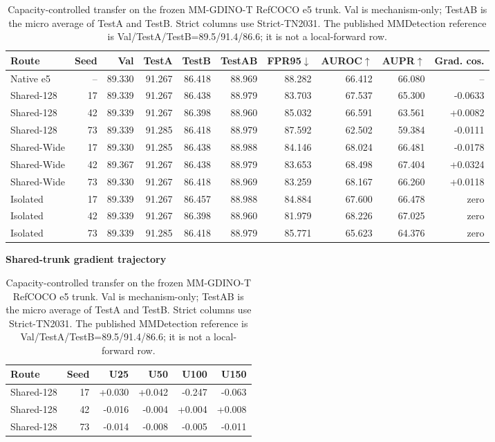 \begin{table}[t]
\centering
\caption{Capacity-controlled transfer on the frozen MM-GDINO-T RefCOCO e5
trunk.  Val is mechanism-only; TestAB is the micro average of TestA and TestB.
Strict columns use Strict-TN2031.  The published MMDetection reference is
Val/TestA/TestB=89.5/91.4/86.6; it is not a local-forward row.}
\label{tab:supp-strong-ownership}
\scriptsize
\setlength{\tabcolsep}{3.2pt}
\begin{tabular}{lrrrrrrrrr}
\toprule
Route & Seed & Val & TestA & TestB & TestAB & FPR95$\downarrow$ & AUROC$\uparrow$ & AUPR$\uparrow$ & Grad. cos.\\
\midrule
Native e5 & -- & 89.330 & 91.267 & 86.418 & 88.969 & 88.282 & 66.412 & 66.080 & -- \\
Shared-128 & 17 & 89.339 & 91.267 & 86.438 & 88.979 & 83.703 & 67.537 & 65.300 & -0.0633 \\
Shared-128 & 42 & 89.339 & 91.267 & 86.398 & 88.960 & 85.032 & 66.591 & 63.561 & +0.0082 \\
Shared-128 & 73 & 89.339 & 91.285 & 86.418 & 88.979 & 87.592 & 62.502 & 59.384 & -0.0111 \\
Shared-Wide & 17 & 89.330 & 91.285 & 86.438 & 88.988 & 84.146 & 68.024 & 66.481 & -0.0178 \\
Shared-Wide & 42 & 89.367 & 91.267 & 86.438 & 88.979 & 83.653 & 68.498 & 67.404 & +0.0324 \\
Shared-Wide & 73 & 89.330 & 91.267 & 86.418 & 88.969 & 83.259 & 68.167 & 66.260 & +0.0118 \\
Isolated & 17 & 89.339 & 91.267 & 86.457 & 88.988 & 84.884 & 67.600 & 66.478 & zero \\
Isolated & 42 & 89.339 & 91.267 & 86.398 & 88.960 & 81.979 & 68.226 & 67.025 & zero \\
Isolated & 73 & 89.339 & 91.285 & 86.418 & 88.979 & 85.771 & 65.623 & 64.376 & zero \\
\bottomrule
\end{tabular}
\par\medskip
\textbf{Shared-trunk gradient trajectory}\par\smallskip
\begin{tabular}{lrrrrr}
\toprule
Route & Seed & U25 & U50 & U100 & U150\\
\midrule
Shared-128 & 17 & +0.030 & +0.042 & -0.247 & -0.063 \\
Shared-128 & 42 & -0.016 & -0.004 & +0.004 & +0.008 \\
Shared-128 & 73 & -0.014 & -0.008 & -0.005 & -0.011 \\

\end{tabular}
\end{table}
